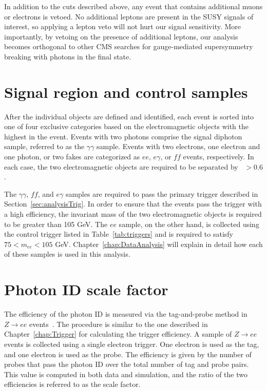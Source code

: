 In addition to the cuts described above, any event that contains additional muons or electrons is vetoed. 
No additional leptons are present in the SUSY signals of interest, so applying a lepton veto will not hurt our signal sensitivity.
More importantly, by vetoing on the presence of additional leptons, our analysis becomes orthogonal to other CMS searches for
gauge-mediated supersymmetry breaking with photons in the final state. 

\section{Signal region and control samples}
\label{sec:samples}
After the individual objects are defined and identified, each event is sorted into one of four exclusive categories based on the electromagnetic objects with the highest \pT in the event. Events with two photons comprise the signal diphoton sample, referred to as the $\gamma\gamma$ sample. Events with two electrons, one electron and one photon, or two fakes are categorized as $ee$, $e\gamma$, or $ff$ events, respectively. In each case, the two electromagnetic objects are required to be separated by \dR~$ > 0.6$. 

The  $\gamma\gamma$, $ff$, and $e\gamma$ samples are required to pass the primary trigger described in Section~\ref{sec:analysisTrig}. 
In order to ensure that the events pass the trigger with a high efficiency, the invariant mass of the two electromagnetic objects is required to be greater than 105 GeV. 
The $ee$ sample, on the other hand, is collected using the control trigger listed in Table~\ref{tab:triggers} and is required to satisfy $75 < m_{ee} < 105$ GeV. Chapter~\ref{chap:DataAnalysis} will explain in detail how each of these samples is used in this analysis.


\section{Photon ID scale factor}
\label{sec:phoSF}
The efficiency of the photon ID is measured via the tag-and-probe method in $Z \rightarrow ee$ events~\cite{phoPerf8TeV}. 
The procedure is similar to the one described in Chapter~\ref{chap:Trigger} for calculating the trigger efficiency.
A sample of $Z \rightarrow ee$ events is collected using a single electron trigger. One electron is used as the tag, and 
one electron is used as the probe. The efficiency is given by the number of probes that pass the photon ID over the 
total number of tag and probe pairs. This value is computed in both data and simulation,
and the ratio of the two efficiencies is referred to as the scale factor. 


